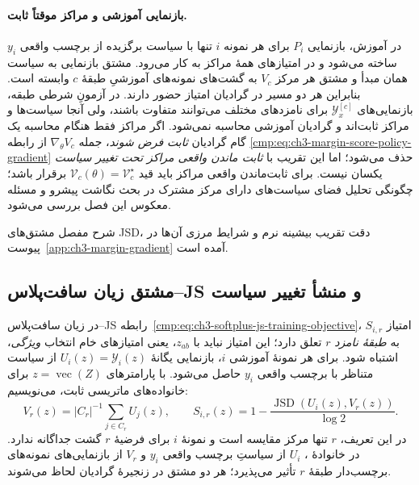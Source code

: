 \paragraph{بازنمایی آموزشی و مراکز موقتاً ثابت.}
در آموزش، بازنمایی $P_i$ برای هر نمونه
$i$ تنها با سیاست برگزیده از برچسب
واقعی $y_i$ ساخته می‌شود و در
امتیازهای همهٔ مراکز به کار می‌رود.
مشتق بازنمایی به سیاست همان مبدأ
و مشتق هر مرکز $V_c$ به گشت‌های
نمونه‌های آموزشیِ طبقهٔ $c$
وابسته است. بنابراین هر دو مسیر
در گرادیان امتیاز حضور دارند.
در آزمونِ شرطی طبقه، بازنمایی‌های
$\mathscr Y_x^{[c]}$ برای نامزدهای
مختلف می‌توانند متفاوت باشند،
ولی آنجا سیاست‌ها و مراکز ثابت‌اند
و گرادیان آموزشی محاسبه نمی‌شود.
اگر مراکز فقط هنگام
محاسبه یک گام گرادیان
\emph{ثابت فرض شوند}،
جمله
$\nabla_\theta V_c$
از رابطه
\eqref{cmp:eq:ch3-margin-score-policy-gradient}
حذف می‌شود؛ اما این
تقریب با \emph{ثابت
ماندن واقعی مراکز
تحت تغییر سیاست}
یکسان نیست. برای
ثابت‌ماندن واقعی
مراکز باید قید
$\mathcal V_c(\theta)
=\mathcal V_c^\star$
برقرار باشد؛ چگونگی
تحلیل فضای سیاست‌های
دارای مرکز مشترک
در بحث نگاشت پیشرو
و مسئله معکوس این فصل
بررسی می‌شود.

شرح مفصل مشتق‌های
JSD، دقت تقریب
بیشینه نرم و شرایط
مرزی آن‌ها در
پیوست~\ref{app:ch3-margin-gradient}
آمده است.




\subsection{مشتق زیان سافت‌پلاس--JS و منشأ تغییر سیاست}
\label{cmp:subsec:ch3-softplus-js-policy-gradient}
در زیان سافت‌پلاس--JS رابطه~\eqref{cmp:eq:ch3-softplus-js-training-objective}،
امتیاز $S_{i,r}$ به \emph{طبقهٔ نامزد} $r$ تعلق دارد؛
این امتیاز نباید با $z_{ab}$، یعنی امتیازهای خام انتخاب \emph{ویژگی}، اشتباه شود.
برای هر نمونهٔ آموزشی $i$،
بازنمایی یگانهٔ
$U_i(z)=\mathscr Y_i(z)$
از سیاست متناظر با برچسب واقعی
$y_i$ حاصل می‌شود. با پارامترهای
$z=\operatorname{vec}(Z)$ برای
خانواده‌های ماتریسی ثابت، می‌نویسیم:
\[
V_r(z)=|C_r|^{-1}\sum_{j\in C_r}U_j(z),
\qquad
S_{i,r}(z)=1-\frac{\operatorname{JSD}(U_i(z),V_r(z))}{\log2}.
\]
در این تعریف، $r$ تنها مرکز مقایسه
است و نمونهٔ $i$ برای فرضیهٔ $r$
گشت جداگانه ندارد. در خانوادهٔ
، $U_i$ از سیاستِ برچسب
واقعی $y_i$ و $V_r$ از بازنمایی‌های
نمونه‌های برچسب‌دار طبقهٔ $r$
تأثیر می‌پذیرد؛ هر دو مشتق
در زنجیرهٔ گرادیان لحاظ می‌شوند.

